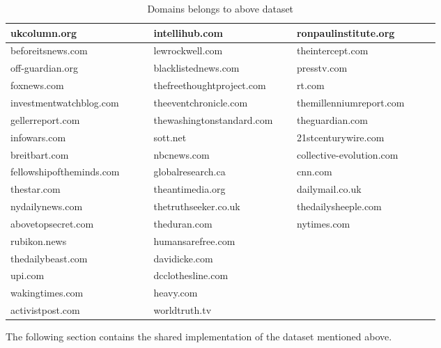 \documentclass[12pt]{article}
\begin{document}
\begin{table}[h]
\centering
\caption{Domains belongs to above dataset}
\label{tbl:simple}
\begin{tabular}{p{0.30\linewidth}p{0.30\linewidth}p{0.30\linewidth}}
ukcolumn.org	&	intellihub.com		&	ronpaulinstitute.org	\\ \hline
beforeitsnews.com	&	lewrockwell.com		&	theintercept.com	\\ \hline
off-guardian.org	&	blacklistednews.com		&	presstv.com	\\ \hline
foxnews.com	&	thefreethoughtproject.com		&	rt.com	\\ \hline
investmentwatchblog.com	&	theeventchronicle.com		&	themillenniumreport.com	\\ \hline
gellerreport.com	&	thewashingtonstandard.com		&	theguardian.com	\\ \hline
infowars.com	&	sott.net		&	21stcenturywire.com	\\ \hline
breitbart.com	&	nbcnews.com		&	collective-evolution.com	\\ \hline
fellowshipoftheminds.com	&	globalresearch.ca		&	cnn.com	\\ \hline
thestar.com	&	theantimedia.org		&	dailymail.co.uk	\\ \hline
nydailynews.com	&	thetruthseeker.co.uk		&	thedailysheeple.com	\\ \hline
abovetopsecret.com	&	theduran.com		&	nytimes.com	\\ \hline
rubikon.news	&	humansarefree.com		&		\\ \hline
thedailybeast.com	&	davidicke.com		&		\\ \hline
upi.com	&	dcclothesline.com		&		\\ \hline
wakingtimes.com	&	heavy.com		&		\\ \hline
activistpost.com	&	worldtruth.tv		&		\\ \hline

\end{tabular}
\end{table}


\clearpage
The following section contains the shared implementation of the dataset mentioned above.
\end{document}
